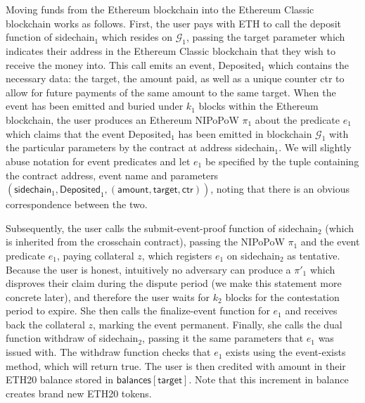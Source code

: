 Moving funds from the Ethereum blockchain into the Ethereum Classic blockchain
works as follows. First, the user pays with ETH to call the \textsf{deposit}
function of \textsf{sidechain}$_1$ which resides on $\mathcal{G}_1$, passing the
\textsf{target} parameter which indicates their address in the Ethereum Classic
blockchain that they wish to receive the money into. This call emits an event,
\textsf{Deposited}$_1$ which contains the necessary data: the \textsf{target},
the \textsf{amount} paid, as well as a unique counter \textsf{ctr} to allow for
future payments of the same amount to the same target. When the event has been
emitted and buried under $k_1$ blocks within the Ethereum blockchain, the user
produces an Ethereum NIPoPoW $\pi_1$ about the predicate $e_1$ which claims that
the event \textsf{Deposited}$_1$ has been emitted in blockchain $\mathcal{G}_1$
with the particular parameters by the contract at address
\textsf{sidechain}$_1$. We will slightly abuse notation for event predicates and
let $e_1$ be specified by the tuple containing the contract address, event name
and parameters $(\textsf{sidechain}_1, \textsf{Deposited}_1, (\textsf{amount},
\textsf{target}, \textsf{ctr}))$, noting that there is an obvious correspondence
between the two.

Subsequently, the user calls the \textsf{submit-event-proof} function of
\textsf{sidechain}$_2$ (which is inherited from the \textsf{crosschain}
contract), passing the NIPoPoW $\pi_1$ and the event predicate $e_1$, paying
collateral $z$, which registers $e_1$ on \textsf{sidechain}$_2$ as tentative.
Because the user is honest, intuitively no adversary can produce a $\pi'_1$
which disproves their claim during the dispute period (we make this statement
more concrete later), and therefore the user waits for $k_2$ blocks for the
contestation period to expire. She then calls the \textsf{finalize-event}
function for $e_1$ and receives back the collateral $z$, marking the event
permanent. Finally, she calls the dual function \textsf{withdraw} of
\textsf{sidechain}$_2$, passing it the same parameters that $e_1$ was issued
with. The \textsf{withdraw} function checks that $e_1$ exists using the
\textsf{event-exists} method, which will return \textsf{true}. The user is then
credited with \textsf{amount} in their ETH20 balance stored in
$\textsf{balances}[\textsf{target}]$. Note that this increment in balance
creates brand new ETH20 tokens.

